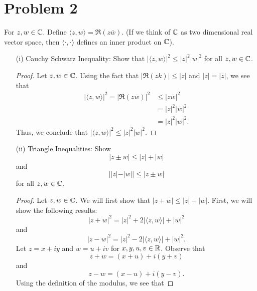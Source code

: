 \documentclass[a4paper]{article}
\begin{document}
    \section*{Problem 2}  For \( z,w \in \mathbb{C}  \). Define \( \langle z , w \rangle = \Re(z \overline{w}) \). (If we think of \(  \mathbb{C}  \) as two dimensional real vector space, then \( \langle \cdot  ,  \cdot  \rangle  \) defines an inner product on \( \mathbb{C}  \)). 
        \begin{enumerate}
            \item[(i)] Cauchy Schwarz Inequality: 
                Show that \( | \langle z , w \rangle |^{2} \leq | z |^{2} | w |^{2} \) for all \( z,w \in \mathbb{C}  \).
                \begin{proof}
                    Let \( z,w \in \mathbb{C}  \). Using the fact that \( | \Re(zk) |  \leq | z  |  \) and \( | z  |  = | \overline{z} |  \), we see that  
                    \begin{align*}
                        | \langle z , w \rangle |^{2} = | \Re(z \overline{w}) |^{2} &\leq | z \overline{w} |^{2}  \\
                                                                                    &= | z  |^{2} | \overline{w}  |^{2} \\
                                                                                    &= | z  |^{2} | w |^{2}.
                    \end{align*}
                    Thus, we conclude that \( | \langle z , w \rangle |^{2} \leq | z |^{2} | w |^{2} \). 
                \end{proof}
            \item[(ii)] Triangle Inequalities: Show 
                \[  | z \pm w  | \leq | z  |  + | w  | \]
                and 
                \[  | | z  |  - | w |  | \leq | z \pm w  |  \]
                for all \( z,w \in \mathbb{C}  \).
                \begin{proof}
                Let \( z,w \in \mathbb{C}  \). We will first show that \(  | z + w  | \leq | z  |  + | w |  \). First, we will show the following results:
                \[  | z + w  |^{2} = | z |^{2} + 2 | \langle z , w \rangle | + | w |^{2} \tag{1} \]
                and 
                \[  | z - w  |^{2} = | z |^{2} - 2 | \langle z , w \rangle | + | w |^{2}. \tag{2}  \]
                Let \( z = x + iy \) and \( w = u + i v  \) for \( x,y,u,v \in \mathbb{R}  \). Observe that   
                \[  z + w = (x+u) + i(y +v) \]
                and 
                \[  z - w = (x-u) + i(y - v). \]
                Using the definition of the modulus, we see that

\end{proof}
\end{enumerate}
\end{document}
